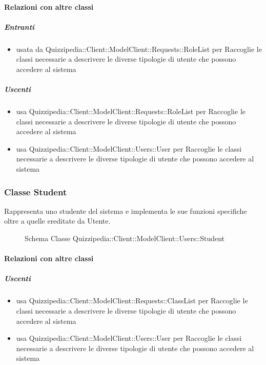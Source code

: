\paragraph{Relazioni con altre classi}
\subparagraph{Entranti}
\begin{itemize}
\item usata da Quizzipedia::Client::ModelClient::Requests::RoleList per Raccoglie le classi necessarie a descrivere le diverse tipologie di utente che possono accedere al sistema
\end{itemize}
\subparagraph{Uscenti}
\begin{itemize}
\item usa Quizzipedia::Client::ModelClient::Requests::RoleList per Raccoglie le classi necessarie a descrivere le diverse tipologie di utente che possono accedere al sistema
\item usa Quizzipedia::Client::ModelClient::Users::User per Raccoglie le classi necessarie a descrivere le diverse tipologie di utente che possono accedere al sistema
\end{itemize}
\subsubsection{Classe Student}
Rappresenta uno studente del sistema e implementa le sue funzioni specifiche oltre a quelle ereditate da Utente.
\begin{figure}[H]
\centering
\noindent{}
\caption[Schema Classe Student]{Schema Classe Quizzipedia::Client::ModelClient::Users::Student}
\end{figure}
\paragraph{Relazioni con altre classi}
\subparagraph{Uscenti}
\begin{itemize}
\item usa Quizzipedia::Client::ModelClient::Requests::ClassList per Raccoglie le classi necessarie a descrivere le diverse tipologie di utente che possono accedere al sistema
\item usa Quizzipedia::Client::ModelClient::Users::User per Raccoglie le classi necessarie a descrivere le diverse tipologie di utente che possono accedere al sistema
\end{itemize}

